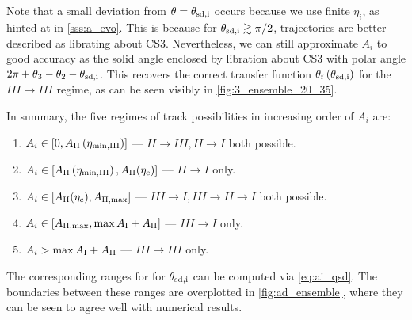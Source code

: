 \documentclass[
        fleqn,
        usenatbib,
        referee,
    ]{mnras}
\newcommand*{\p}[1]{\left(#1\right)}
\newcommand*{\s}[1]{\left[#1\right]}
\begin{document}
\begin{enumerate}
        Note that a small deviation from $\theta = \theta_{\rm sd, i}$ occurs
        because we use finite $\eta_i$, as hinted at in \autoref{sss:a_evo}.
        This is because for $\theta_{\rm sd, i} \gtrsim \pi/2$, trajectories are
        better described as librating about CS3. Nevertheless, we can still
        approximate $A_i$ to good accuracy as the solid angle enclosed by
        libration about CS3 with polar angle $2\pi + \theta_3 - \theta_2 -
        \theta_{\rm sd, i}$. This recovers the correct transfer function
        $\theta_{\rm f}\p{\theta_{\rm sd, i}}$ for the $III \to III$ regime, as
        can be seen visibly in \autoref{fig:3_ensemble_20_35}.
\end{enumerate}
In summary, the five regimes of track possibilities in increasing order of $A_i$
are:
\begin{enumerate}
    \item $A_i \in \s{0, A_{\rm II}\p{\eta_{\rm \min, III}}}$ --- $II \to III,
        II \to I$ both possible.

    \item $A_i \in \s{A_{\rm II}\p{\eta_{\rm \min, III}}, A_{\rm II}(\eta_{\rm c})}$
        --- $II \to I$ only.

    \item $A_i \in \s{A_{\rm II}(\eta_{\rm c}), A_{\rm II, \max}}$ --- $III \to I, III
        \to II \to I$ both possible.

    \item $A_i \in \s{A_{\rm II, \max}, \max A_{\rm I} + A_{\rm II}}$ --- $III
        \to I$ only.

    \item $A_i > \max A_{\rm I} + A_{\rm II}$ --- $III \to III$ only.
\end{enumerate}
The corresponding ranges for for $\theta_{\rm sd,i}$ can be computed via
\autoref{eq:ai_qsd}. The boundaries between these ranges are overplotted in
\autoref{fig:ad_ensemble}, where they can be seen to agree well with numerical
results.
\end{document}
